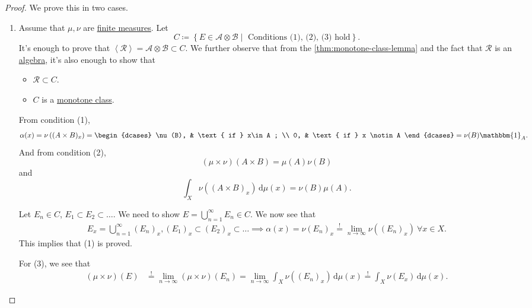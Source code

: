 \begin{proof}
	We prove this in two cases.
	\begin{enumerate}
		\item Assume that \(\mu , \nu \) are \hyperref[def:finite-measure]{finite measures}. Let
		      \[
			      C \coloneqq \left\{E\in \mathcal{A} \otimes \mathcal{B} \mid \text{ Conditions (1), (2), (3) hold} \right\}.
		      \]
		      It's enough to prove that \(\left< \mathcal{R}  \right> = \mathcal{A} \otimes \mathcal{B} \subset C\).
		      We further observe that from the \autoref{thm:monotone-class-lemma} and the fact that \(\mathcal{R} \) is an \hyperref[def:algebra]{algebra},
		      it's also enough to show that
		      \begin{itemize}
			      \item \(\mathcal{R} \subset C\).
			      \item \(C\) is a \hyperref[def:monotone-class]{monotone class}.
		      \end{itemize}
		      \par From condition (1),
		      \[
			      \alpha (x) = \nu \left((A\times B)_x\right) = \begin{dcases}
				      \nu (B), & \text{ if } x\in A ;   \\
				      0,       & \text{ if } x \notin A
			      \end{dcases} = \nu (B)\mathbbm{1}_{A}.
		      \]
		      And from condition (2),
		      \[
			      (\mu \times \nu )(A\times B) = \mu (A)\nu (B)
		      \]
		      and
		      \[
			      \int _X \nu ((A\times B)_x)\,\mathrm{d} \mu (x) = \nu (B)\mu (A).
		      \]

		      \par Let \(E_{n} \in C\), \(E_1\subset E_{2}\subset \dots\). We need to show \(E = \bigcup_{n=1}^{\infty} E_{n} \in C\).
		      We now see that
		      \[
			      \begin{split}
				      E_{x}  = \bigcup_{n=1}^{\infty} (E_{n} )_x, (E_1)_x\subset (E_2)_x\subset \dots
				      \implies \alpha (x) = \nu (E_n)_x \overset{\hyperref[thm:measure-space-continuity-from-below]{!}}{=} \lim_{n \to \infty} \nu ((E_n)_x)\ \forall x\in X.
			      \end{split}
		      \]
		      This implies that (1) is proved.

		      For (3), we see that
		      \[
			      \begin{split}
				      (\mu \times \nu )(E) & \overset{\hyperref[thm:measure-space-continuity-from-below]{!}}{=}\lim_{n \to \infty} (\mu \times \nu )(E_{n} )
				      = \lim_{n \to \infty} \int _X \nu ((E_{n})_x) \,\mathrm{d} \mu (x)
				      \overset{\hyperref[thm:MCT]{!}}{=} \int _X \nu (E_{x} )\,\mathrm{d} \mu (x).
			      \end{split}
		      \]


\end{enumerate}
\end{proof}

